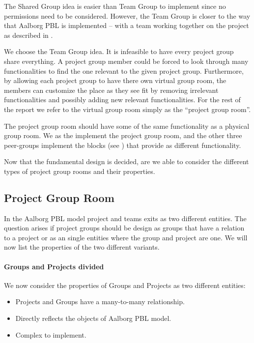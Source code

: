 The Shared Group idea is easier than Team Group to implement since no permissions need to be considered.
However, the Team Group is closer to the way that Aalborg PBL is implemented -- with a team working together on the project as described in .

We choose the Team Group idea. 
It is infeasible to have every project group share everything.
A project group member could be forced to look through many functionalities to find the one relevant to the given project group.
Furthermore, by allowing each project group to have there own virtual group room, the members can customize the place as they see fit by removing irrelevant functionalities and possibly adding new relevant functionalities.
For the rest of the report we refer to the virtual group room simply as the ``project group room''.

The project group room should have some of the same functionality as a physical group room.
We as the \groupname{} implement the project group room, and the other three peer-groups implement the blocks (see ) that provide as different functionality.

Now that the fundamental design is decided, are we able to consider the different types of project group rooms and their properties.

\subsection{Project Group Room}
In the Aalborg PBL model project and teams exits as two different entities. The question arises if project groups should be design as groups that have a relation to a project or as an single entities where the group and project are one. We will now list the properties of the two different variants. 

\paragraph{Groups and Projects divided} We now consider the properties of Groups and Projects as two different entities:
\begin{itemize}
	\item Projects and Groups have a many-to-many relationship.
	\item Directly reflects the objects of Aalborg PBL model.
	\item Complex to implement.
\end{itemize}


